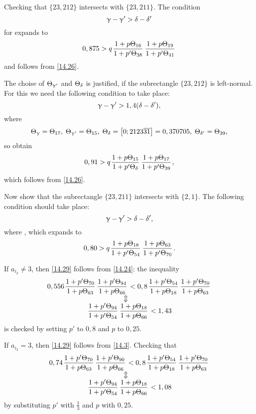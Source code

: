 Checking that $\{23, 212\}$ intersects with $\{23, 211\}$.
The condition
\begin{equation*}
	\upgamma - \upgamma' > \delta - \delta'
\end{equation*}
for
expands to
\begin{equation*}
	0,875 > q \up{16}{38} \up{19}{41}
\end{equation*}
and follows from \ref{14.26}.

The choise of $\Theta_{\upgamma'}$ and $\Theta_{\delta}$ is justified,
if the subrectangle $\{23, 212\}$ is left-normal.
For this we need the following condition to take place:
\begin{equation*}
	\upgamma - \upgamma' > 1,4 (\delta - \delta'),
\end{equation*}
where
\begin{equation*}
	\Theta_{\upgamma} = \Theta_{17},\;
	\Theta_{\upgamma'} = \Theta_{15},\;
	\Theta_{\delta} = \left[0; 2123\overline{31}\right] = 0,370705,\;
	\Theta_{\delta'} = \Theta_{39},
\end{equation*}
so obtain
\begin{equation*}
	0,91 > q \up{15}{\d} \up{17}{39},
\end{equation*}
which follows from \ref{14.26}.

Now show that the subrectangle $\{23, 211\}$ intersects with $\{2, 1\}$.
The following condition should take place:
\begin{equation*}
	\upgamma - \upgamma' > \delta - \delta',
\end{equation*}
where
,
which expands to
\begin{equation}\label{14.29}
	0,80 > q \up{18}{54} \up{63}{70}.
\end{equation}

If $a_{i_2} \ne 3$, then \ref{14.29} follows from \ref{14.24}:
the inequality
\begin{gather*}
	0,556 \pu{70}{63} \pu{94}{66} < 0,8 \pu{54}{18} \pu{70}{63}\\
	\ArrowBetweenLines
	\pp{94}{54} \uu{18}{66} < 1,43
\end{gather*}
is checked by setting $p'$ to $0,8$ and $p$ to $0,25$.

If $a_{i_2} = 3$, then \ref{14.29} follows from \ref{14.3}.
Checking that
\begin{gather*}
	0,74 \pu{70}{63} \pu{90}{66} < 0,8 \pu{54}{18} \pu{70}{63}\\
	\ArrowBetweenLines
	\pp{94}{54} \uu{18}{66} < 1,08
\end{gather*}
by substituting $p'$ with $\frac{1}{3}$ and $p$ with $0,25$.

